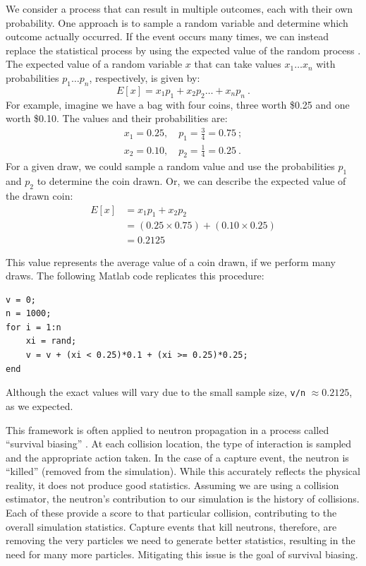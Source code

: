 We consider a process that can result in multiple outcomes, each with
their own probability. One approach is to sample a random variable and
determine which outcome actually occurred. If the event occurs many
times, we can instead replace the
statistical process by using the expected value of the random process
\cite{lux1991}. The expected value of a random variable $x$ that can
take values ${x_1 \ldots x_n}$ with  probabilities ${p_1 \ldots p_n}$, respectively,
is given by:
\begin{equation}
  \label{eq:expval}
  E[x] = x_1p_1 + x_2p_2 \ldots + x_{n}p_n\:.
\end{equation}
For example, imagine we have a bag with four coins, three worth \$0.25 and
one worth \$0.10. The values and their probabilities are:
\begin{align*}
  x_1 = 0.25, \quad p_1 = \frac{3}{4} = 0.75 \:;\\
  x_2 = 0.10, \quad p_2 = \frac{1}{4} = 0.25\:.
\end{align*}
For a given draw, we could sample a random value and use the
probabilities $p_1$ and $p_2$ to determine the coin drawn. Or, we can
describe the expected value of the drawn coin:
\begin{align*}
  E[x] &= x_1p_1 + x_2p_2 \\
  &= (0.25 \times 0.75) + (0.10 \times 0.25) \\
  &= 0.2125
\end{align*}
\begin{minipage}{1.0\linewidth}
  This value represents the average value of a coin drawn, if we
  perform many draws. The following Matlab code replicates this
  procedure:
\begin{lstlisting}
v = 0;
n = 1000;
for i = 1:n
    xi = rand;  
    v = v + (xi < 0.25)*0.1 + (xi >= 0.25)*0.25;
end
\end{lstlisting}
\end{minipage}
%
Although the exact values will vary due to the small sample size, \verb|v/n|
$\approx 0.2125$, as we expected.

This framework is often applied to neutron propagation in a process
called ``survival biasing'' \cite{lewis1993}. At each collision location, the type of
interaction is sampled and the appropriate action taken. In the case
of a capture event, the neutron is ``killed'' (removed from the
simulation). While this accurately reflects the physical reality, it
does not produce good statistics. Assuming we are using a collision
estimator, the neutron's contribution to our simulation is the history
of collisions. Each of these provide a score to that particular
collision, contributing to the overall simulation
statistics. Capture events that kill neutrons, therefore, are
removing the very particles we need to generate better statistics,
resulting in the need for many more particles. Mitigating this issue
is the goal of survival biasing.

